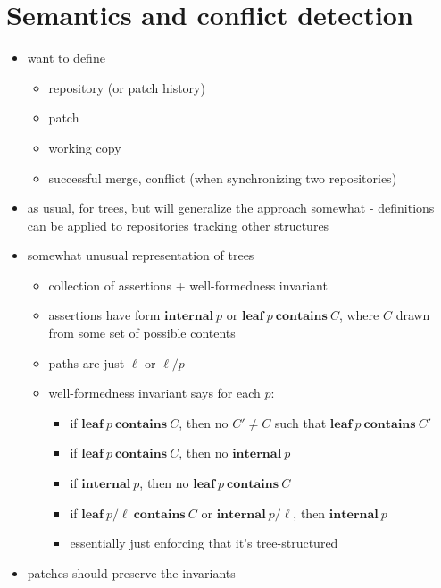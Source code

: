 \documentclass{article}
\newcommand{\internal}{\ensuremath{\mathbf{internal}}\ }
\newcommand{\leaf}{\ensuremath{\mathbf{leaf}}\ }
\newcommand{\contains}{\ \ensuremath{\mathbf{contains}}\ }
\begin{document}
\section{Semantics and conflict detection}
\begin{itemize}
    \item want to define
        \begin{itemize}
            \item repository (or patch history)
            \item patch
            \item working copy
            \item successful merge, conflict (when synchronizing two
                repositories)
        \end{itemize}
    \item as usual, for trees, but will generalize the approach somewhat -
        definitions can be applied to repositories tracking other structures
    \item somewhat unusual representation of trees
        \begin{itemize}
            \item collection of assertions + well-formedness invariant
            \item assertions have form $\internal p$ or $\leaf p \contains
                C$, where $C$ drawn from some set of possible contents
            \item paths are just $\ell$ or $\ell/p$
            \item well-formedness invariant says for each $p$:
                \begin{itemize}
                    \item if $\leaf p \contains C$, then no $C' \ne C$ such
                        that $\leaf p \contains C'$
                    \item if $\leaf p \contains C$, then no $\internal p$
                    \item if $\internal p$, then no $\leaf p \contains C$
                    \item if $\leaf p/\ell \contains C$ or $\internal
                        p/\ell$, then $\internal p$
                    \item essentially just enforcing that it's
                        tree-structured
                \end{itemize}
        \end{itemize}
    \item patches should preserve the invariants

\end{itemize}
\end{document}
